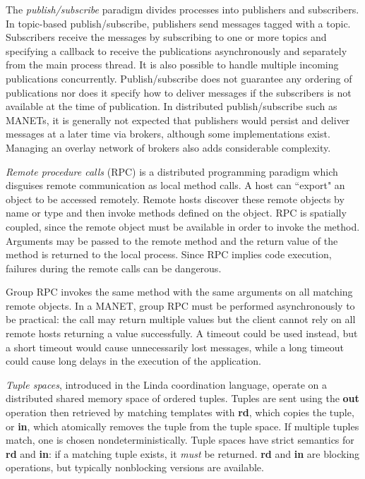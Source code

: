 \documentclass{llncs}
\begin{document}
The \textit{publish/subscribe} paradigm divides processes into publishers and subscribers. In topic-based publish/subscribe, publishers send messages tagged with a topic. Subscribers receive the messages by subscribing to one or more topics and specifying a callback to receive the publications asynchronously and separately from the main process thread. It is also possible to handle multiple incoming publications concurrently. Publish/subscribe does not guarantee any ordering of publications nor does it specify how to deliver messages if the subscribers is not available at the time of publication. In distributed publish/subscribe such as MANETs, it is generally not expected that publishers would persist and deliver messages at a later time via brokers\cite{psfaces}, although some implementations exist\cite{reds}. Managing an overlay network of brokers also adds considerable complexity.

\textit{Remote procedure calls} (RPC) is a distributed programming paradigm which disguises remote communication as local method calls. A host can ``export" an object to be accessed remotely. Remote hosts discover these remote objects by name or type and then invoke methods defined on the object. RPC is spatially coupled, since the remote object must be available in order to invoke the method. Arguments may be passed to the remote method and the return value of the method is returned to the local process. Since RPC implies code execution, failures during the remote calls can be dangerous\cite{distbook}.

Group RPC invokes the same method with the same arguments on all matching remote objects. In a MANET, group RPC must be performed asynchronously to be practical: the call may return multiple values but the client cannot rely on all remote hosts returning a value successfully. A timeout could be used instead, but a short timeout would cause unnecessarily lost messages, while a long timeout could cause long delays in the execution of the application.

\textit{Tuple spaces}, introduced in the Linda\cite{linda} coordination language, operate on a distributed shared memory space of ordered tuples. Tuples are sent using the \textbf{out} operation then retrieved by matching templates with \textbf{rd}, which copies the tuple, or \textbf{in}, which atomically removes the tuple from the tuple space. If multiple tuples match, one is chosen nondeterministically. Tuple spaces have strict semantics for \textbf{rd} and \textbf{in}: if a matching tuple exists, it \textit{must} be returned. \textbf{rd} and \textbf{in} are blocking operations, but typically nonblocking versions are available.
\end{document}
